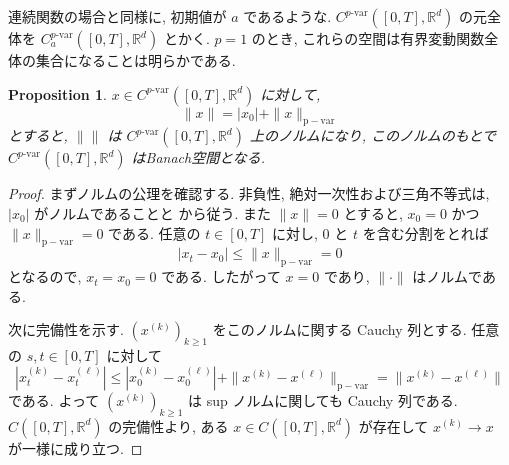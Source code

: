 \documentclass[11pt]{article}
\theoremstyle{breakstyle}
\newtheorem{proposition}[theorem]{Proposition}
\begin{document}
連続関数の場合と同様に, 初期値が $a$ であるような.  $C^{p\text{-var}}([0,T],\mathbb{R}^d)$ の元全体を $C_a^{p\text{-var}}([0,T],\mathbb{R}^d)$ とかく.
$p=1$ のとき, これらの空間は有界変動関数全体の集合になることは明らかである.
\begin{proposition}
    \label{prop:pvar-banach}
    $x\in C^{p\text{-var}}([0,T],\mathbb{R}^d)$ に対して, 
    \begin{equation*}
        \|x\|=|x_0|+\|x\|_{\mathrm{p-var}}
    \end{equation*}
    とすると, $\|\|$ は $C^{p\text{-var}}([0,T],\mathbb{R}^d)$ 上のノルムになり, このノルムのもとで $C^{p\text{-var}}([0,T],\mathbb{R}^d)$
    はBanach空間となる.
\end{proposition}
\begin{proof}
    まずノルムの公理を確認する. 非負性, 絶対一次性および三角不等式は,
    $|x_0|$ がノルムであることと  から従う.
    また $\|x\|=0$ とすると, $x_0=0$ かつ
    $\|x\|_{\mathrm{p-var}}=0$ である. 任意の $t\in[0,T]$ に対し,
    $0$ と $t$ を含む分割をとれば
    \begin{equation*}
        |x_t-x_0|\leq \|x\|_{\mathrm{p-var}}=0
    \end{equation*}
    となるので, $x_t=x_0=0$ である. したがって $x=0$ であり,
    $\|\cdot\|$ はノルムである.

    次に完備性を示す. $(x^{(k)})_{k\geq1}$ をこのノルムに関する
    Cauchy 列とする. 任意の $s,t\in[0,T]$ に対して
    \begin{equation*}
        |x_t^{(k)}-x_t^{(\ell)}|
        \leq |x_0^{(k)}-x_0^{(\ell)}|
        +\|x^{(k)}-x^{(\ell)}\|_{\mathrm{p-var}}
        =\|x^{(k)}-x^{(\ell)}\|
    \end{equation*}
    である. よって $(x^{(k)})_{k\geq1}$ は sup ノルムに関しても
    Cauchy 列である. $C([0,T],\mathbb{R}^d)$ の完備性より,
    ある $x\in C([0,T],\mathbb{R}^d)$ が存在して $x^{(k)}\to x$ が一様に成り立つ.


\end{proof}
\end{document}
